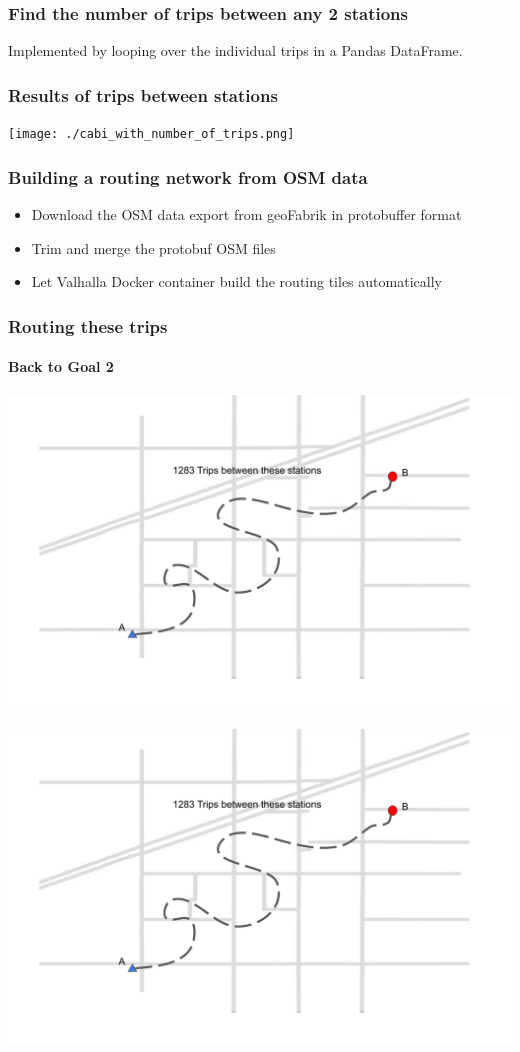 \documentclass{beamer}
\begin{document}
\begin{frame}
    \frametitle{Find the number of trips between any 2 stations}

    Implemented by looping over the individual trips in a Pandas DataFrame.
\end{frame}
\begin{frame}
    \frametitle{Results of trips between stations}
    \texttt{[image: ./cabi\_with\_number\_of\_trips.png]}
\end{frame}
\begin{frame}
    \frametitle{Building a routing network from OSM data}
    \begin{itemize}
        \item Download the OSM data export from geoFabrik in protobuffer format
        \item Trim and merge the protobuf OSM files
        \item Let Valhalla Docker container build the routing tiles automatically 
    \end{itemize}
\end{frame}
\begin{frame}
    \frametitle{Routing these trips}
    \framesubtitle{Back to Goal 2}
    \includegraphics[width=\textwidth,page=1]{graphics_document.pdf}
\end{frame}
\begin{frame}
    \includegraphics[width=\textwidth,page=2]{graphics_document.pdf}
\end{frame}
\end{document}
